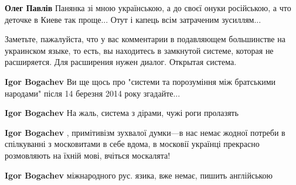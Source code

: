 \begin{itemize}
\begin{itemize}
\textbf{Олег Павлів}
Панянка зі мною українською, а до своєї онуки російською, а что деточке в Киеве так проще...
Отут і капець всім затраченим зусиллям...
\end{itemize}

 

Заметьте, пажалуйста, что у вас комментарии в подавляющем большинстве на
украинском языке, то есть, вы находитесь в замкнутой системе, которая не
расширяется. Для расширения нужен диалог. Открытая система.

\begin{itemize}
 
\textbf{Igor Bogachev} Ви ще щось про "системи та порозуміння між братськими народами" після 14 березня 2014 року згадайте...

 
\textbf{Igor Bogachev} На жаль, система з дірами, чужі роги пролазять

 
\textbf{Igor Bogachev} , примітивізм зухвалої думки—в нас немає жодної потреби в спілкуванні з московитами в себе вдома, в московії українці прекрасно розмовляють на їхній мові, вчіться москалята!

 
\textbf{Igor Bogachev} міжнародного рус. язика, вже немає, пишить англійською


\end{itemize}
\end{itemize}
